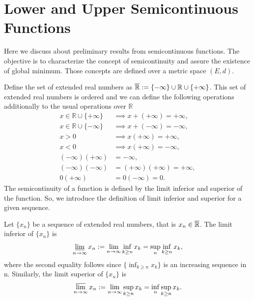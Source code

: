 \section{Lower and Upper Semicontinuous Functions} 

    Here we discuss about preliminary results from semicontinuous functions. The objective is to
    characterize the concept of semicontinuity and assure the existence of global minimum.
    Those concepts are defined over a metric space $(E,d)$. 
    
    Define the set of extended real numbers as
    $
        \overline{\mathbb{R}} := \{- \infty \} \cup \mathbb{R} \cup \{ + \infty \}
    $.
    This set of extended real numbers is ordered and we can define the following 
    operations additionally to the usual operations over $\mathbb{R}$
    \begin{align*}
        x \in \mathbb{R} \cup \{+\infty\} &\implies x + (+ \infty) = +\infty, \\
        x \in \mathbb{R} \cup \{-\infty\} &\implies x + (- \infty) = -\infty, \\
        x > 0 &\implies x(+ \infty) = + \infty, \\
        x < 0 &\implies x(+ \infty) = - \infty, \\
        (- \infty)(+ \infty) &= -\infty, \\
        (- \infty)(- \infty) &= (+ \infty)(+ \infty) = + \infty, \\
        0(+ \infty) &= 0(-\infty) = 0.
    \end{align*}
    The semicontinuity of a function is defined by the limit inferior
    and superior of the function. So, we introduce the definition of
    limit inferior and superior for a given sequence. 
    \begin{definition}
        Let $\{ x_n \}$ be a sequence of extended real numbers, that is 
        $x_n \in \overline{\mathbb{R}}$. The limit inferior of $\{ x_n \}$ is
        $$
            \varliminf_{n \to \infty} x_n := \lim_{n \to \infty} \inf_{k \geq n}{x_{k}} %
            = \sup_{n} \inf_{k \geq n}{x_k},
        $$
        where the second equality follows since $\{ \inf_{k \geq n}{x_k} \}$ 
        is an increasing sequence in n. Similarly, the limit superior of 
        $\{ x_n \}$ is
        $$
            \varlimsup_{n \to \infty} x_n := \lim_{n \to \infty} \sup_{k \geq n}{x_{k}} %
            = \inf_{n} \sup_{k \geq n}{x_k}.
        $$
    \end{definition}
